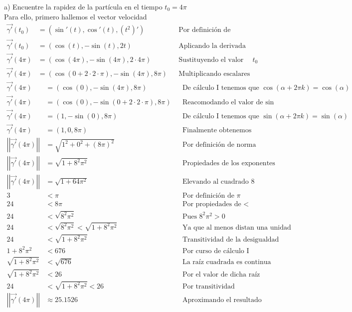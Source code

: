 \documentclass[letterpaper]{article}
\providecommand{\norm}[1]{\left|\left|#1\right|\right|}
\renewcommand{\*}{\cdot}
\theoremstyle{definition}
\begin{document}
\noindent a) Encuentre la rapidez de la partícula en el tiempo  $t_0 = 4\pi$\\
Para ello, primero hallemos el vector velocidad 
\begin{align*}
	\vec{\gamma'}(t_0) &= (\sin'(t) , \cos'(t), (t^2)') && \text{Por definición de velocidad}\\
	\vec{\gamma'}(t_0) &= (\cos(t), - \sin(t), 2t) && \text{Aplicando la derivada}\\
	\vec{\gamma'}(4\pi) &= (\cos(4\pi), - \sin(4\pi), 2\*4\pi) && \text{Sustituyendo el valor de }t_0\\
	\vec{\gamma'}(4\pi) &= (\cos( 0 + 2\*2\*\pi), - \sin(4\pi), 8\pi) && \text{Multiplicando escalares}
	\end{align*}
\begin{align*}
	\vec{\gamma'}(4\pi) &= (\cos(0), - \sin(4\pi), 8\pi) && \text{De cálculo I tenemos que } \cos(\alpha + 2\pi k) = \cos(\alpha)\\
	\vec{\gamma'}(4\pi) &= (\cos(0), - \sin( 0 + 2\*2\*\pi), 8\pi) && \text{Reacomodando el valor de } \sin\\
	\vec{\gamma'}(4\pi) &= (1, -\sin(0), 8\pi) && \text{De cálculo I tenemos que } \sin(\alpha + 2\pi k) = \sin(\alpha)\\
	\vec{\gamma'}(4\pi) &= (1,0, 8\pi) && \text{Finalmente obtenemos }\\
	\norm{\vec{\gamma'}(4\pi)} &= \sqrt{1^2 + 0^2 + (8\pi)^2} && \text{Por definición de norma }\\
	\norm{\vec{\gamma'}(4\pi)} &= \sqrt{1+ 8^2\pi^2} && \text{Propiedades de los exponentes }\\
	\norm{\vec{\gamma'}(4\pi)} &= \sqrt{1+ 64\pi^2} && \text{Elevando al cuadrado } 8\\
	3 &< \pi && \text{Por definición de }\pi \\
	24 &< 8\pi && \text{Por propiedades de }< \\
	24 &< \sqrt{8^2\pi^2} && \text{Pues  }8^2\pi^2 > 0 \\
	24 &< \sqrt{8^2\pi^2} < \sqrt{1 +8^2\pi^2} && \text{Ya que al menos distan una unidad  }\\
	24 &< \sqrt{1 +8^2\pi^2} && \text{Transitividad de la desigualdad }\\
	1 +8^2\pi^2 &< 676 && \text{Por curso de cálculo I} \\
	\sqrt{1 +8^2\pi^2} &< \sqrt{676} && \text{La raíz cuadrada es continua} \\
	\sqrt{1 +8^2\pi^2} &< 26 && \text{Por el valor de dicha raíz} \\
	24 &< \sqrt{1 +8^2\pi^2} < 26 && \text{Por transitividad } \\
	\norm{\vec{\gamma'}(4\pi)} &\approx 25.1526 && \text{Aproximando el resultado }
\end{align*}
\end{document}
